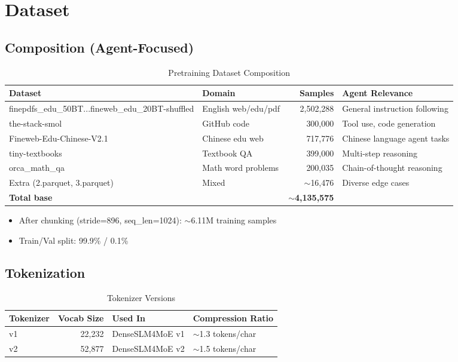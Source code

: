 \section{Dataset}
\label{sec:dataset}

\subsection{Composition (Agent-Focused)}

\begin{table}[h]
    \centering
    \caption{Pretraining Dataset Composition}
    \begin{tabular}{llrl}
        \toprule
        \textbf{Dataset} & \textbf{Domain} & \textbf{Samples} & \textbf{Agent Relevance} \\
        \midrule
        finepdfs\_edu\_50BT...fineweb\_edu\_20BT-shuffled & English web/edu/pdf & 2,502,288 & General instruction following \\
        the-stack-smol & GitHub code & 300,000 & Tool use, code generation \\
        Fineweb-Edu-Chinese-V2.1 & Chinese edu web & 717,776 & Chinese language agent tasks \\
        tiny-textbooks & Textbook QA & 399,000 & Multi-step reasoning \\
        orca\_math\_qa & Math word problems & 200,035 & Chain-of-thought reasoning \\
        Extra (2.parquet, 3.parquet) & Mixed & $\sim$16,476 & Diverse edge cases \\
        \midrule
        \textbf{Total base} & & \textbf{$\sim$4,135,575} & \\
        \bottomrule
    \end{tabular}
\end{table}

\begin{itemize}
    \item After chunking (stride=896, seq\_len=1024): $\sim$6.11M training samples
    \item Train/Val split: 99.9\% / 0.1\%
\end{itemize}

\subsection{Tokenization}

\begin{table}[h]
    \centering
    \caption{Tokenizer Versions}
    \begin{tabular}{lrll}
        \toprule
        \textbf{Tokenizer} & \textbf{Vocab Size} & \textbf{Used In} & \textbf{Compression Ratio} \\
        \midrule
        v1 & 22,232 & DenseSLM4MoE v1 & $\sim$1.3 tokens/char \\
        v2 & 52,877 & DenseSLM4MoE v2 & $\sim$1.5 tokens/char \\
        \bottomrule
    \end{tabular}
\end{table}

